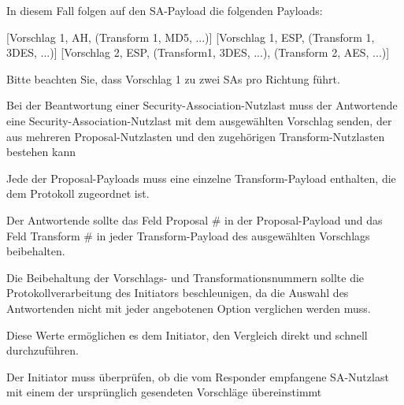 \documentclass[a4paper]{article}
\begin{document}
\begin{multicols}{3}
\begin{itemize*}
\begin{itemize*}
\begin{itemize*}
                        \item In diesem Fall folgen auf den SA-Payload die folgenden Payloads:
                        \begin{itemize*} \item {[}Vorschlag 1, AH, (Transform 1, MD5, ...){]} {[}Vorschlag 1, ESP, (Transform 1, 3DES, ...){]} {[}Vorschlag 2, ESP, (Transform1, 3DES, ...), (Transform 2, AES, ...){]} \end{itemize*}
                        \item Bitte beachten Sie, dass Vorschlag 1 zu zwei SAs pro Richtung führt.
                  \end{itemize*}
                  \item       Bei der Beantwortung einer Security-Association-Nutzlast muss der
                  Antwortende eine Security-Association-Nutzlast mit dem ausgewählten
                  Vorschlag senden, der aus mehreren Proposal-Nutzlasten und den
                  zugehörigen Transform-Nutzlasten bestehen kann
                  \item       Jede der Proposal-Payloads muss eine einzelne Transform-Payload
                  enthalten, die dem Protokoll zugeordnet ist.
                  \item       Der Antwortende sollte das Feld Proposal \# in der Proposal-Payload
                  und das Feld Transform \# in jeder Transform-Payload des ausgewählten
                  Vorschlags beibehalten.
                  \begin{itemize*}
                        \item Die Beibehaltung der Vorschlags- und Transformationsnummern sollte die Protokollverarbeitung des Initiators beschleunigen, da die Auswahl des Antwortenden nicht mit jeder angebotenen Option verglichen werden muss.
                        \item Diese Werte ermöglichen es dem Initiator, den Vergleich direkt und schnell durchzuführen.
                  \end{itemize*}
                  \item       Der Initiator muss überprüfen, ob die vom Responder empfangene
                  SA-Nutzlast mit einem der ursprünglich gesendeten Vorschläge
                  übereinstimmt
            \end{itemize*}


\end{itemize*}
\end{multicols}
\end{document}
